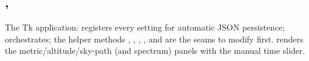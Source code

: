 \subsection{, }
The Tk application:  registers every setting for
automatic JSON persistence;  orchestrates; the helper
methods , ,
, ,
 and
 are the seams to modify first.
 renders the metric/altitude/sky-path
(and spectrum) panels with the manual time slider.
